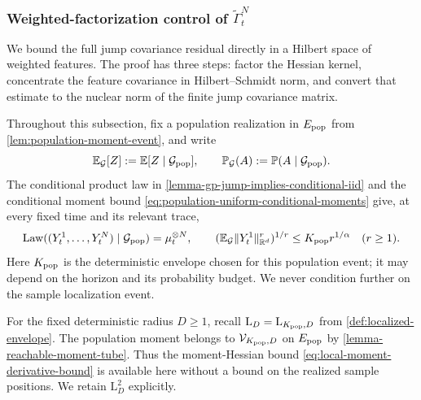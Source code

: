 \subsubsection{Weighted-factorization control of $\widetilde\Gamma_t^N$}
\label{subsubsec:weighted-factorization-tilde-gamma}

We bound the full jump covariance residual directly in a Hilbert space of
weighted features. The proof has three steps: factor the Hessian kernel,
concentrate the feature covariance in Hilbert--Schmidt norm, and convert
that estimate to the nuclear norm of the finite jump covariance matrix.

Throughout this subsection, fix a population realization in $E_{\rm pop}$
from \cref{lem:population-moment-event}, and write
\[
 \mathbb E_{\mathcal G}[Z]:=\mathbb E[Z\mid\mathcal G_{\rm pop}],
 \qquad
 \mathbb P_{\mathcal G}(A):=\mathbb P(A\mid\mathcal G_{\rm pop}).
\]
The conditional product law in \cref{lemma-gp-jump-implies-conditional-iid}
and the conditional moment bound \eqref{eq:population-uniform-conditional-moments}
give, at every fixed time and its relevant trace,
\begin{equation}
\label{eq:weighted-feature-conditional-input}
 \operatorname{Law}((Y_t^1,\ldots,Y_t^N)\mid\mathcal G_{\rm pop})
 =\mu_t^{\otimes N},\qquad
 (\mathbb E_{\mathcal G}\|Y_t^1\|_{\mathbb R^d}^r)^{1/r}
 \le K_{\rm pop}r^{1/\alpha}\quad(r\ge1).
\end{equation}
Here $K_{\rm pop}$ is the deterministic envelope chosen for this population
event; it may depend on the horizon and its probability budget. We never
condition further on the sample localization event.

For the fixed deterministic radius $D\ge1$, recall
$\mathrm L_D=\mathrm L_{K_{\rm pop},D}$ from
\cref{def:localized-envelope}. The population moment belongs to
$\mathcal V_{K_{\rm pop},D}$ on $E_{\rm pop}$ by
\cref{lemma-reachable-moment-tube}. Thus the moment-Hessian bound
\eqref{eq:local-moment-derivative-bound} is available here without a bound
on the realized sample positions. We retain $\mathrm L_D^2$ explicitly.

